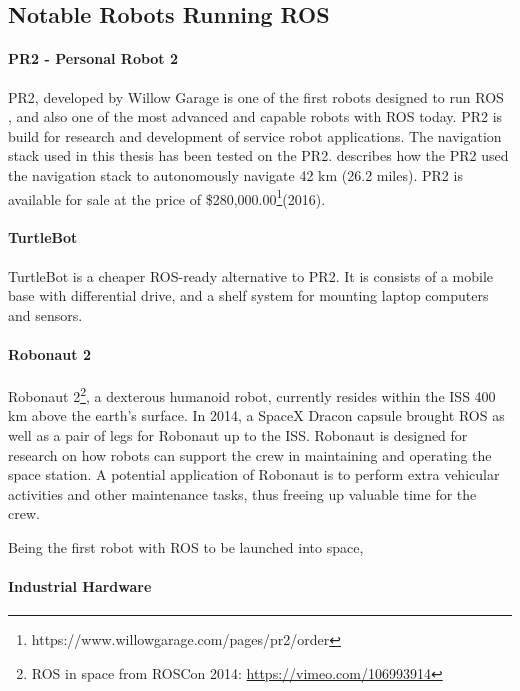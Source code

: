 \subsection{Notable Robots Running ROS}

\paragraph{PR2 - Personal Robot 2}

PR2, developed by Willow Garage is one of the first robots designed to run \ac{ROS} \cite{rosbook15}, and also one of the most advanced and capable robots with \ac{ROS} today. PR2 is build for research and development of service robot applications. The navigation stack used in this thesis has been tested on the PR2. \cite{tbd} describes how the PR2 used the navigation stack to autonomously navigate 42 km (26.2 miles). PR2 is available for sale at the price of \$280,000.00\footnote{https://www.willowgarage.com/pages/pr2/order}(2016).

\paragraph{TurtleBot} 

TurtleBot is a cheaper ROS-ready alternative to PR2. It is consists of a mobile base with differential drive, and a shelf system for mounting laptop computers and sensors.

\paragraph{Robonaut 2}

Robonaut 2\footnote{\ac{ROS} in space from ROSCon 2014: \url{https://vimeo.com/106993914}}, a dexterous humanoid robot, currently resides within the \ac{ISS} 400 km above the earth's surface. In 2014, a SpaceX Dracon capsule brought \ac{ROS} as well as a pair of legs for Robonaut up to the \ac{ISS}\cite{ROS_space}. Robonaut is designed for research on how robots can support the crew in maintaining and operating the space station. A potential application of Robonaut is to perform extra vehicular activities and other maintenance tasks, thus freeing up valuable time for the crew.

Being the first robot with \ac{ROS} to be launched into space, 

\paragraph{Industrial Hardware}

